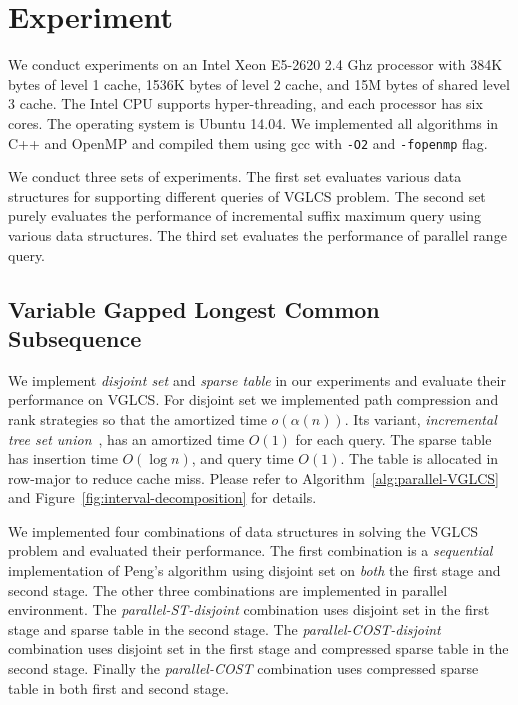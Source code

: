 \section{Experiment} \label{sec:Experiment}

We conduct experiments on an Intel Xeon E5-2620 2.4 Ghz processor with
384K bytes of level 1 cache, 1536K bytes of level 2 cache, and 15M
bytes of shared level 3 cache.  The Intel CPU supports
hyper-threading, and each processor has six cores.  The operating
system is Ubuntu 14.04.  We implemented all algorithms in C++ and
OpenMP and compiled them using gcc with {\tt -O2} and {\tt -fopenmp}
flag.

We conduct three sets of experiments.  The first set evaluates various
data structures for supporting different queries of VGLCS problem.
The second set purely evaluates the performance of incremental suffix
maximum query using various data structures.  The third set evaluates
the performance of parallel range query.

\subsection{Variable Gapped Longest Common Subsequence}

We implement {\em disjoint set} and {\em sparse table} in our
experiments and evaluate their performance on VGLCS.  For disjoint set
we implemented path compression and rank strategies so that the
amortized time $o(\alpha(n))$.  Its variant, {\em incremental tree set
  union}~\cite{Gabow1983ALA}, has an amortized time $O(1)$ for each
query.  The sparse table has insertion time $O(\log n)$, and query
time $O(1)$.  The table is allocated in row-major to reduce cache
miss.  Please refer to Algorithm~\ref{alg:parallel-VGLCS} and
Figure~\ref{fig:interval-decomposition} for details.

We implemented four combinations of data structures in solving the
VGLCS problem and evaluated their performance.  The first combination
is a {\em sequential} implementation of Peng's algorithm using
disjoint set on {\em both} the first stage and second stage.  The
other three combinations are implemented in parallel environment.  The
{\em parallel-ST-disjoint} combination uses disjoint set in the first
stage and sparse table in the second stage.  The {\em
  parallel-COST-disjoint} combination uses disjoint set in the first
stage and compressed sparse table in the second stage.  Finally the
{\em parallel-COST} combination uses compressed sparse table in both
first and second stage.

